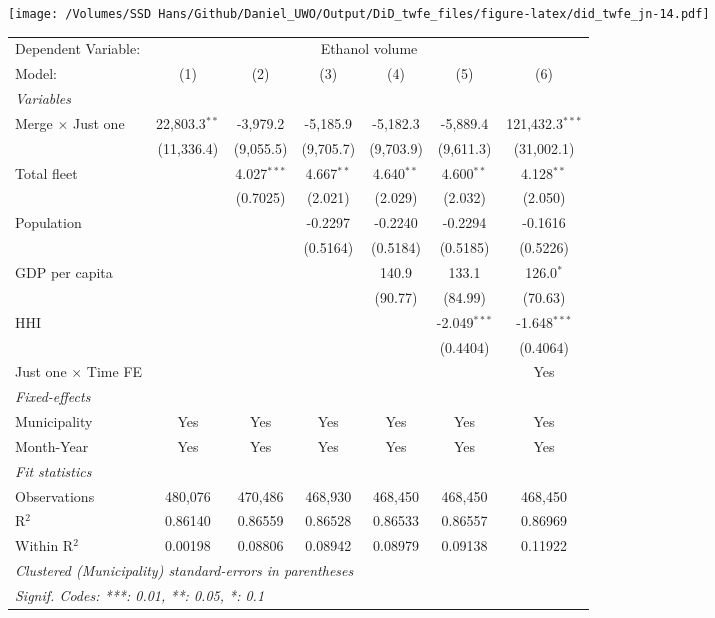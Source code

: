 \documentclass[
]{article}
\begin{document}
\texttt{[image: /Volumes/SSD Hans/Github/Daniel\_UWO/Output/DiD\_twfe\_files/figure-latex/did\_twfe\_jn-14.pdf]}

\begin{tabular}{lcccccc}
\tabularnewline\midrule\midrule
Dependent Variable:&\multicolumn{6}{c}{Ethanol volume}\\
Model:&(1) & (2) & (3) & (4) & (5) & (6)\\
\midrule \emph{Variables}&   &   &   &   &   &  \\
Merge $\times $ Just one & 22,803.3$^{**}$ & -3,979.2 & -5,185.9 & -5,182.3 & -5,889.4 & 121,432.3$^{***}$\\
  &(11,336.4) & (9,055.5) & (9,705.7) & (9,703.9) & (9,611.3) & (31,002.1)\\
Total fleet &    & 4.027$^{***}$ & 4.667$^{**}$ & 4.640$^{**}$ & 4.600$^{**}$ & 4.128$^{**}$\\
  &   & (0.7025) & (2.021) & (2.029) & (2.032) & (2.050)\\
Population &    &    & -0.2297 & -0.2240 & -0.2294 & -0.1616\\
  &   &    & (0.5164) & (0.5184) & (0.5185) & (0.5226)\\
GDP per capita &    &    &    & 140.9 & 133.1 & 126.0$^{*}$\\
  &   &    &    & (90.77) & (84.99) & (70.63)\\
HHI &    &    &    &    & -2.049$^{***}$ & -1.648$^{***}$\\
  &   &    &    &    & (0.4404) & (0.4064)\\
Just one $\times$ Time FE &  &  &  &  &  & Yes\\
\midrule \emph{Fixed-effects}&   &   &   &   &   &  \\
Municipality & Yes & Yes & Yes & Yes & Yes & Yes\\
Month-Year & Yes & Yes & Yes & Yes & Yes & Yes\\
\midrule \emph{Fit statistics}&  & & & & & \\
Observations & 480,076&470,486&468,930&468,450&468,450&468,450\\
R$^2$ & 0.86140&0.86559&0.86528&0.86533&0.86557&0.86969\\
Within R$^2$ & 0.00198&0.08806&0.08942&0.08979&0.09138&0.11922\\
\midrule\midrule\multicolumn{7}{l}{\emph{Clustered (Municipality) standard-errors in parentheses}}\\
\multicolumn{7}{l}{\emph{Signif. Codes: ***: 0.01, **: 0.05, *: 0.1}}\\
\end{tabular}
\end{document}
